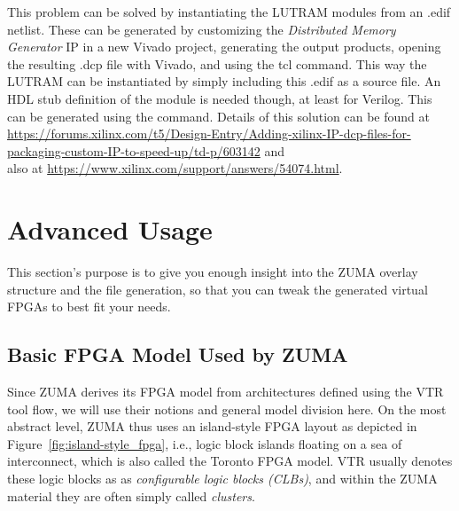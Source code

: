 \documentclass{article}
\newcommand{\command}[1]{\texttt{\detokenize{#1}}}
\begin{document}
This problem can be solved by instantiating the LUTRAM modules from an .edif netlist. These can be generated by customizing the \emph{Distributed Memory Generator} IP in a new Vivado project, generating the output products, opening the resulting .dcp file with Vivado, and using the \command{write_edif} tcl command. This way the LUTRAM can be instantiated by simply including this .edif as a source file. An HDL stub definition of the module is needed though, at least for Verilog. This can be generated using the \command{write_verilog -mode port} command.
Details of this solution can be found at \url{https://forums.xilinx.com/t5/Design-Entry/Adding-xilinx-IP-dcp-files-for-packaging-custom-IP-to-speed-up/td-p/603142} and\\ also at \url{https://www.xilinx.com/support/answers/54074.html}.









\clearpage
\section{Advanced Usage}
\label{sec:advancedusage}
This section's purpose is to give you enough insight into the ZUMA overlay structure and the file generation, so that you can tweak the generated virtual FPGAs to best fit your needs.





\subsection{Basic FPGA Model Used by ZUMA}
Since ZUMA derives its FPGA model from architectures defined using the VTR tool flow, we will use their notions and general model division here.
On the most abstract level, ZUMA thus uses an island-style FPGA layout as depicted in Figure~\ref{fig:island-style_fpga}, i.e., logic block islands floating on a sea of interconnect, which is also called the Toronto FPGA model.
VTR usually denotes these logic blocks as as \emph{configurable logic blocks (CLBs)}, and within the ZUMA material they are often simply called \emph{clusters}.
\end{document}
